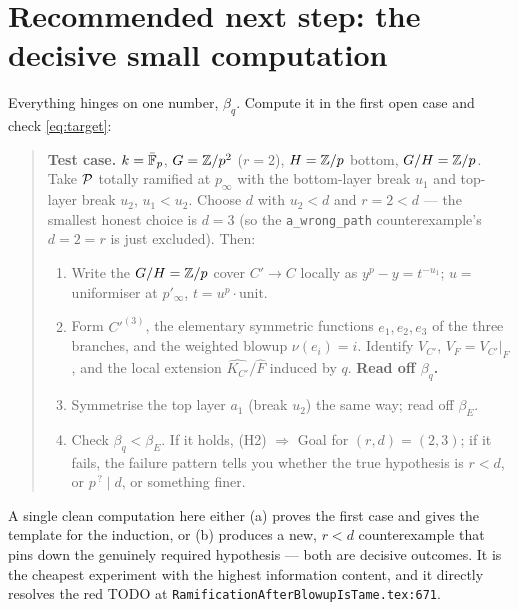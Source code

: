 \documentclass[11pt]{article}
\begin{document}
\section{Recommended next step: the decisive small computation}\label{sec:plan}

Everything hinges on one number, $\beta_q$. Compute it in the first open case
and check \cref{eq:target}:
\begin{quote}
\textbf{Test case.} $k=\bar{\mathbb{F}}_p$, $G=\mathbb{Z}/p^2$ ($r=2$), $H=\mathbb{Z}/p$ bottom,
$G/H=\mathbb{Z}/p$. Take $\mathcal{P}$ totally ramified at $p_\infty$ with the bottom-layer
break $u_1$ and top-layer break $u_2$, $u_1<u_2$. Choose $d$ with
$u_2<d$ and $r=2<d$ --- the smallest honest choice is $d=3$ (so the
\texttt{a\_wrong\_path} counterexample's $d=2=r$ is just excluded). Then:
\begin{enumerate}
  \item Write the $G/H=\mathbb{Z}/p$ cover $C'\to C$ locally as $y^p-y=t^{-u_1}$;
        $u=$ uniformiser at $p'_\infty$, $t=u^{p}\cdot\text{unit}$.
  \item Form $C'^{(3)}$, the elementary symmetric functions $e_1,e_2,e_3$ of the
        three branches, and the weighted blowup $\nu(e_i)=i$. Identify $V_{C'}$,
        $V_F=V_{C'}|_F$, and the local extension $\widehat{K_{C'}}/\widehat F$
        induced by $q$. \textbf{Read off $\beta_q$.}
  \item Symmetrise the top layer $a_1$ (break $u_2$) the same way; read off
        $\beta_E$.
  \item Check $\beta_q<\beta_E$. If it holds, (H2) $\Rightarrow$ Goal for
        $(r,d)=(2,3)$; if it fails, the failure pattern tells you whether the
        true hypothesis is $r<d$, or $p^{\,?}\mid d$, or something finer.
\end{enumerate}
\end{quote}

\noindent A single clean computation here either (a) proves the first case and
gives the template for the induction, or (b) produces a new, $r<d$
counterexample that pins down the genuinely required hypothesis --- both are
decisive outcomes. It is the cheapest experiment with the highest information
content, and it directly resolves the red TODO at
\texttt{RamificationAfterBlowupIsTame.tex:671}.
\end{document}
